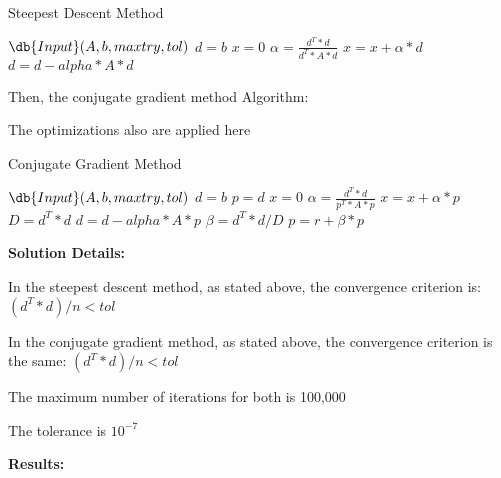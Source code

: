     \begin{algorithm}[H]
        \begin{algorithmic}[1]
            \caption{Steepest Descent Method}
            \State $\db{Input}(A,b,maxtry,tol)$
            \State $d=b$
            \State $x=0$
                \State $\alpha=\frac{d^T* d}{d^T* A * d}$
                \State $x=x+\alpha * d$
                \State $d=d-alpha*A*d$
                    \State {}
                \EndIf
            \EndFor
            \State {}
        \end{algorithmic}
    \end{algorithm}

Then, the conjugate gradient method Algorithm:

The optimizations  also are applied here
    \begin{algorithm}[H]
        \begin{algorithmic}[1]
            \caption{Conjugate Gradient Method}
            \State $\db{Input}(A,b,maxtry,tol)$
            \State $d=b$
            \State $p=d$
            \State $x=0$
                \State $\alpha=\frac{d^T* d}{p^T* A * p}$
                \State $x=x+\alpha * p$
                \State $D=d^T*d$
                \State $d=d-alpha*A*p$
                \State $\beta=d^T*d/D$
                \State $p=r+\beta*p$
                    \State {}
                \EndIf
            \EndFor
            \State {}
        \end{algorithmic}
    \end{algorithm}


    
{\LARGE \textbf{Solution Details:}}

In the steepest descent method, as stated above, the convergence criterion is: $(d^T* d)/n < tol$

In the conjugate gradient method, as stated above, the convergence criterion is the same: $(d^T* d)/n < tol$

The maximum number of iterations for both is 100,000

The tolerance is $10^{-7}$

  
\clearpage
{\LARGE \textbf{Results:}}

